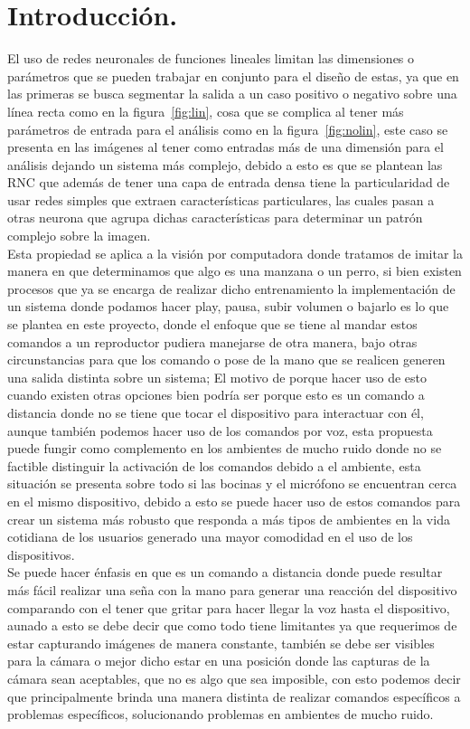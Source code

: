 \documentclass[a4paper, 12pt]{article}
\begin{document}
    \section{Introducción.} 
    El uso de redes neuronales de funciones lineales limitan las dimensiones o parámetros que se pueden trabajar en conjunto para el diseño de estas, ya que en las primeras se busca segmentar la salida a un caso positivo o negativo sobre una línea recta como en la figura~\ref{fig:lin}, cosa que se complica al tener más parámetros de entrada para el análisis como en la figura~\ref{fig:nolin}, este caso se presenta en las imágenes al tener como entradas más de una dimensión para el análisis dejando un sistema más complejo, debido a esto es que se plantean las RNC que además de tener una capa de entrada densa tiene la particularidad de usar redes simples que extraen características particulares, las cuales pasan a otras neurona que agrupa dichas características para determinar un patrón complejo sobre la imagen.\\ 
    Esta propiedad se aplica a la visión por computadora donde tratamos de imitar la manera en que determinamos que algo es una manzana o un perro, si bien existen procesos que ya se encarga de realizar dicho entrenamiento la implementación de un sistema donde podamos hacer play, pausa, subir volumen o bajarlo es lo que se plantea en este proyecto, donde el enfoque que se tiene al mandar estos comandos a un reproductor pudiera manejarse de otra manera, bajo otras circunstancias para que los comando o pose de la mano que se realicen generen una salida distinta sobre un sistema; El motivo de porque hacer uso de esto cuando existen otras opciones bien podría ser porque esto es un comando a distancia donde no se tiene que tocar el dispositivo para interactuar con él, aunque también podemos hacer uso de los comandos por voz, esta propuesta puede fungir como complemento en los ambientes de mucho ruido donde no se factible distinguir la activación de los comandos debido a el ambiente, esta situación se presenta sobre todo si las bocinas y el micrófono se encuentran cerca en el mismo dispositivo, debido a esto se puede hacer uso de estos comandos para crear un sistema más robusto que responda a más tipos de ambientes en la vida cotidiana de los usuarios generado una mayor comodidad en el uso de los dispositivos.\\ 
    Se puede hacer énfasis en que es un comando a distancia donde puede resultar más fácil realizar una seña con la mano para generar una reacción del dispositivo comparando con el tener que gritar para hacer llegar la voz hasta el dispositivo, aunado a esto se debe decir que como todo tiene limitantes ya que requerimos de estar capturando imágenes de manera constante, también se debe ser visibles para la cámara o mejor dicho estar en una posición donde las capturas de la cámara sean aceptables, que no es algo que sea imposible, con esto podemos decir que principalmente brinda una manera distinta de realizar comandos específicos a problemas específicos, solucionando problemas en ambientes de mucho ruido. 
\end{document}
